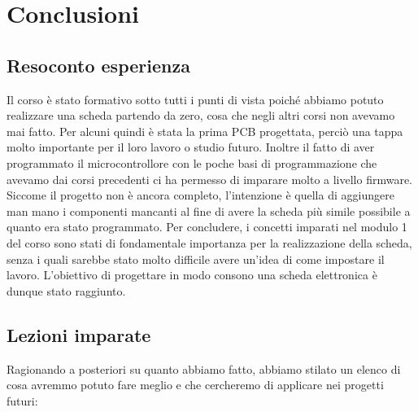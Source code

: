 \chapter{Conclusioni}

\hypertarget{resoconto-esperienza}{%
\section{\texorpdfstring{Resoconto esperienza
}{Resoconto esperienza }}\label{resoconto-esperienza}}

Il corso è stato formativo sotto tutti i punti di vista poiché abbiamo
potuto realizzare una scheda partendo da zero, cosa che negli altri
corsi non avevamo mai fatto. Per alcuni quindi è stata la prima PCB
progettata, perciò una tappa molto importante per il loro lavoro o
studio futuro. Inoltre il fatto di aver programmato il microcontrollore
con le poche basi di programmazione che avevamo dai corsi precedenti ci
ha permesso di imparare molto a livello firmware. Siccome il progetto
non è ancora completo, l'intenzione è quella di aggiungere man mano i
componenti mancanti al fine di avere la scheda più simile possibile a
quanto era stato programmato. Per concludere, i concetti imparati nel
modulo 1 del corso sono stati di fondamentale importanza per la
realizzazione della scheda, senza i quali sarebbe stato molto difficile
avere un'idea di come impostare il lavoro. L'obiettivo di progettare in
modo consono una scheda elettronica è dunque stato raggiunto.

\hypertarget{lezioni-imparate}{%
\section{Lezioni imparate}\label{Lezioni-imparate}}

\noindent Ragionando a posteriori su quanto abbiamo fatto, abbiamo stilato un
elenco di cosa avremmo potuto fare meglio e che cercheremo di applicare
nei progetti futuri:

